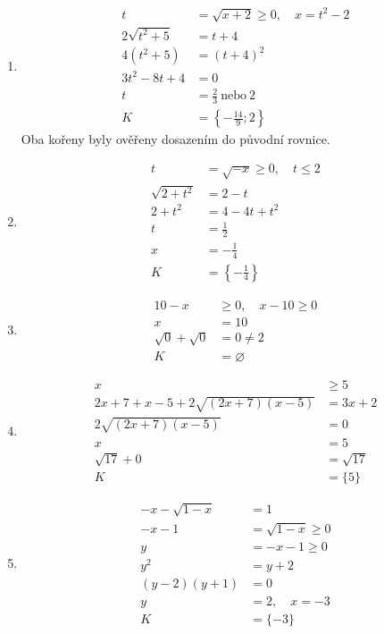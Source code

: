 \documentclass[11pt,a4paper]{article}
\begin{document}
\begin{zadaniReseniBox}[title={Domácí úkol}]
\begin{enumerate}[label=\alph*)]
\item \[\begin{aligned}t&=\sqrt{x+2}\ge0,\quad x=t^2-2\\2\sqrt{t^2+5}&=t+4\\4(t^2+5)&=(t+4)^2\\3t^2-8t+4&=0\\t&=\frac23\ \text{nebo}\ 2\\K&=\left\{-\frac{14}{9};2\right\}\end{aligned}\]
Oba kořeny byly ověřeny dosazením do původní rovnice.
\item \[\begin{aligned}t&=\sqrt{-x}\ge0,\quad t\le2\\\sqrt{2+t^2}&=2-t\\2+t^2&=4-4t+t^2\\t&=\frac12\\x&=-\frac14\\K&=\left\{-\frac14\right\}\end{aligned}\]
\item \[\begin{aligned}10-x&\ge0,\quad x-10\ge0\\x&=10\\\sqrt0+\sqrt0&=0\ne2\\K&=\varnothing\end{aligned}\]
\item \[\begin{aligned}x&\ge5\\2x+7+x-5+2\sqrt{(2x+7)(x-5)}&=3x+2\\2\sqrt{(2x+7)(x-5)}&=0\\x&=5\\\sqrt{17}+0&=\sqrt{17}\\K&=\{5\}\end{aligned}\]
\item \[\begin{aligned}-x-\sqrt{1-x}&=1\\-x-1&=\sqrt{1-x}\ge0\\y&=-x-1\ge0\\y^2&=y+2\\(y-2)(y+1)&=0\\y&=2,\quad x=-3\\K&=\{-3\}\end{aligned}\]
\end{enumerate}
\end{zadaniReseniBox}
\end{document}
